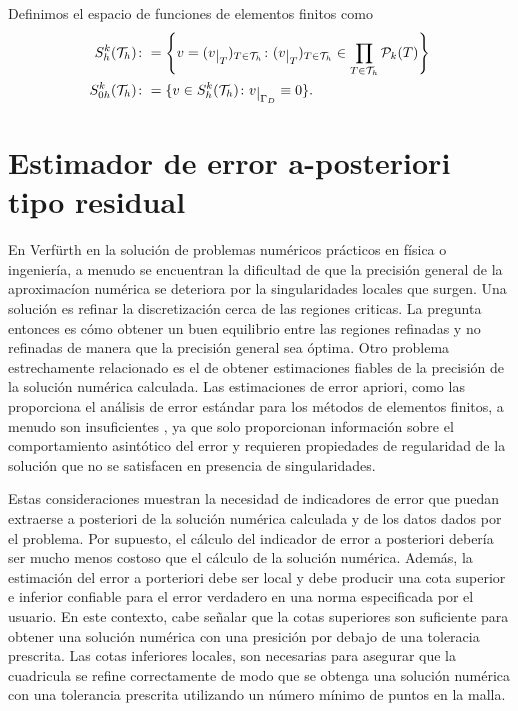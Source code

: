 Definimos el espacio de funciones de elementos finitos como 
\begin{equation}\label{espaciosdiscretos}
\begin{split}
S_{h}^{k}(\mct_{h})\colon &=\left\lbrace v=(v\restr{T})_{T\in \mct_{h}} \colon (v\restr{T})_{T\in \mct_{h}} \in \prod_{T\in \mct_{h}}\mcp_{k}(T) \right\rbrace \\
S^{k}_{0h}(\mct_{h}) \colon &= \{ v\in S^{k}_{h}(\mct_{h}) \colon  v\restr{\Gamma_{D}}\equiv 0 \}.
\end{split}
\end{equation}
\section{Estimador de error a-posteriori tipo residual}
En Verf\"urth \cite[pp. 1-2]{Rudiger2013} en la soluci\'on de problemas num\'ericos pr\'acticos en f\'isica o ingenier\'ia, a menudo se encuentran la dificultad de que la precisi\'on general de la aproximac\'ion num\'erica se deteriora por la singularidades locales que surgen. Una soluci\'on es refinar la discretizaci\'on cerca de las regiones criticas. La pregunta entonces es c\'omo obtener un buen equilibrio entre las regiones refinadas y no refinadas de manera que la precisi\'on general sea \'optima. Otro problema estrechamente relacionado es el de obtener estimaciones fiables de la precisi\'on de la soluci\'on num\'erica calculada. Las estimaciones de error apriori, como las proporciona el an\'alisis de error est\'andar para los m\'etodos de elementos finitos, a menudo son insuficientes , ya que solo proporcionan informaci\'on sobre el comportamiento asint\'otico del error y requieren propiedades de regularidad de la soluci\'on que no se satisfacen en presencia de singularidades. 

Estas consideraciones muestran la necesidad de indicadores de error que puedan extraerse a posteriori de la soluci\'on num\'erica calculada y de los datos dados por el problema. Por supuesto, el c\'alculo del indicador de error a posteriori deber\'ia ser mucho menos costoso que el c\'alculo de la soluci\'on num\'erica. Adem\'as, la estimaci\'on del error a porteriori debe ser local y debe producir una cota superior e inferior confiable para el error verdadero en una norma especificada por el usuario. En este contexto, cabe se\~nalar que la cotas superiores son suficiente para obtener una soluci\'on num\'erica con una presici\'on por debajo de una toleracia prescrita. Las cotas inferiores locales, son necesarias para asegurar que la cuadricula se refine correctamente de modo que se obtenga una soluci\'on num\'erica con una tolerancia prescrita utilizando un n\'umero m\'inimo de puntos en la malla. 

